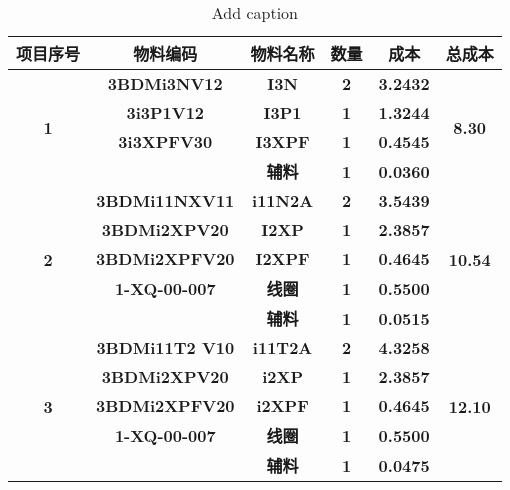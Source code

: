 \documentclass{ctexart}
\begin{document}
\begin{table}[htbp]
  \centering
  \caption{Add caption}
    \begin{tabular}{ccccrc}
    \toprule
    \multicolumn{1}{|c|}{\textbf{项目序号}} & \multicolumn{1}{c|}{\textbf{物料编码}} & \multicolumn{1}{c|}{\textbf{物料名称}} & \multicolumn{1}{c|}{\textbf{数量}} & \multicolumn{1}{c|}{\textbf{成本}} & \multicolumn{1}{c|}{\textbf{总成本}} \\
    \midrule
    \multirow{4}[8]{*}{\textbf{1}} & \textbf{3BDMi3NV12} & \textbf{I3N} & \textbf{2} & \textbf{3.2432 } & \multirow{4}[8]{*}{\textbf{8.30 }} \\
    \cmidrule{2-5}
\cmidrule{2-5}          & \textbf{3i3P1V12} & \textbf{I3P1} & \textbf{1} & \textbf{1.3244 } &  \\
\cmidrule{2-5}          & \textbf{3i3XPFV30} & \textbf{I3XPF} & \textbf{1} & \textbf{0.4545 } &  \\
\cmidrule{2-5}          &       & \textbf{辅料} & \textbf{1} & \textbf{0.0360 } &  \\
    \midrule
    \midrule
    \multirow{5}[10]{*}{\textbf{2}} & \textbf{3BDMi11NXV11} & \textbf{i11N2A} & \textbf{2} & \textbf{3.5439 } & \multirow{5}[10]{*}{\textbf{10.54 }} \\
\cmidrule{2-5}          & \textbf{3BDMi2XPV20} & \textbf{I2XP} & \textbf{1} & \textbf{2.3857 } &  \\
\cmidrule{2-5}          & \textbf{3BDMi2XPFV20} & \textbf{I2XPF} & \textbf{1} & \textbf{0.4645 } &  \\
\cmidrule{2-5}          & \textbf{1-XQ-00-007} & \textbf{线圈} & \textbf{1} & \textbf{0.5500 } &  \\
\cmidrule{2-5}          &       & \textbf{辅料} & \textbf{1} & \textbf{0.0515 } &  \\
    \midrule
    \midrule
    \multirow{5}[10]{*}{\textbf{3}} & \textbf{3BDMi11T2 V10} & \textbf{i11T2A} & \textbf{2} & \textbf{4.3258 } & \multirow{5}[10]{*}{\textbf{12.10 }} \\
\cmidrule{2-5}          & \textbf{3BDMi2XPV20} & \textbf{i2XP} & \textbf{1} & \textbf{2.3857 } &  \\
\cmidrule{2-5}          & \textbf{3BDMi2XPFV20} & \textbf{i2XPF} & \textbf{1} & \textbf{0.4645 } &  \\
\cmidrule{2-5}          & \textbf{1-XQ-00-007} & \textbf{线圈} & \textbf{1} & \textbf{0.5500 } &  \\
\cmidrule{2-5}          &       & \textbf{辅料} & \textbf{1} & \textbf{0.0475 } &  \\

\end{tabular}
\end{table}
\end{document}
